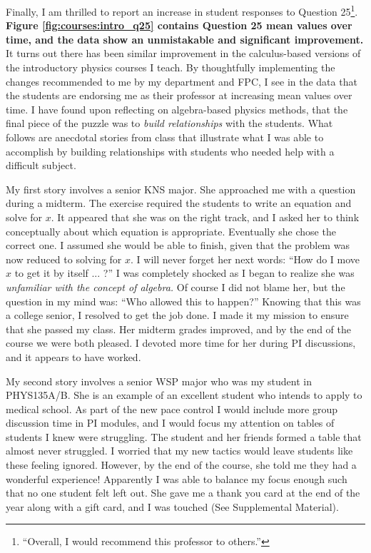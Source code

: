 \documentclass[../../main.tex]{subfiles}
\begin{document}
Finally, I am thrilled to report an increase in student responses to Question 25\footnote{``Overall, I would recommend this professor to others.''}. \textbf{Figure \ref{fig:courses:intro_q25} contains Question 25 mean values over time, and the data show an unmistakable and significant improvement.}  It turns out there has been similar improvement in the calculus-based versions of the introductory physics courses I teach.  By thoughtfully implementing the changes recommended to me by my department and FPC, I see in the data that the students are endorsing me as their professor at increasing mean values over time.  I have found upon reflecting on algebra-based physics methods, that the final piece of the puzzle was to \textit{build relationships} with the students.  What follows are anecdotal stories from class that illustrate what I was able to accomplish by building relationships with students who needed help with a difficult subject.  \\ \hspace{0.1cm}

My first story involves a senior KNS major.  She approached me with a question during a midterm.  The exercise required the students to write an equation and solve for $x$.  It appeared that she was on the right track, and I asked her to think conceptually about which equation is appropriate.  Eventually she chose the correct one.  I assumed she would be able to finish, given that the problem was now reduced to solving for $x$.  I will never forget her next words: ``How do I move $x$ to get it by itself ... ?''  I was completely shocked as I began to realize she was \textit{unfamiliar with the concept of algebra.}  Of course I did not blame her, but the question in my mind was: ``Who allowed this to happen?''  Knowing that this was a college senior, I resolved to get the job done.  I made it my mission to ensure that she passed my class.  Her midterm grades improved, and by the end of the course we were both pleased.  I devoted more time for her during PI discussions, and it appears to have worked.  \\ \hspace{0.1cm}

My second story involves a senior WSP major who was my student in PHYS135A/B.  She is an example of an excellent student who intends to apply to medical school.  As part of the new pace control I would include more group discussion time in PI modules, and I would focus my attention on tables of students I knew were struggling.  The student and her friends formed a table that almost never struggled.  I worried that my new tactics would leave students like these feeling ignored.  However, by the end of the course, she told me they had a wonderful experience!  Apparently I was able to balance my focus enough such that no one student felt left out.  She gave me a thank you card at the end of the year along with a gift card, and I was touched (See Supplemental Material).  \\ \hspace{0.1cm}
\end{document}
